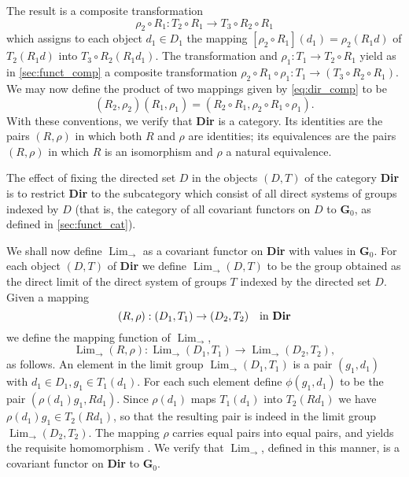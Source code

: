\documentclass[11pt,a4paper]{report}
\DeclareMathOperator{\Lim}{Lim}
\begin{document}
The result is a composite transformation
\begin{equation}\label{eq:dir_comp2}
	\rho_2\circ R_1:T_2\circ R_1\rightarrow T_3\circ R_2\circ R_1
\end{equation}
which assigns to each object $d_1\in D_1$ the mapping $[\rho_2\circ R_1](d_1)=\rho_2(R_1 d)$ of $T_2(R_1 d)$ into $T_3\circ R_2(R_1 d_1)$.
The transformation  and $\rho_1:T_1\rightarrow T_2\circ R_1$ yield as in \cref{sec:funct_comp}
a composite transformation $\rho_2\circ R_1\circ\rho_1: T_1\rightarrow (T_3\circ R_2\circ R_1)$.
We may now define the product of two mappings given by \cref{eq:dir_comp} to be
\begin{equation*}
	(R_2,\rho_2)(R_1,\rho_1)= (R_2\circ R_1,\rho_2\circ R_1\circ\rho_1).
\end{equation*}
With these conventions, we verify that \textbf{Dir} is a category. Its identities are the pairs $(R,\rho)$ in which both $R$ and $\rho$ are
identities; its equivalences are the pairs $(R,\rho)$ in which $R$ is an isomorphism and $\rho$ a natural equivalence.

The effect of fixing the directed set $D$ in the objects $(D,T)$ of the category \textbf{Dir} is to restrict \textbf{Dir} to the subcategory
which consist of all direct systems of groups indexed by $D$ (that is, the category of all covariant functors on $D$ to $\mathbf{G}_0$, as
defined in \cref{sec:funct_cat}).

We shall now define $\Lim_{\rightarrow}$ as a covariant functor on \textbf{Dir} with values in $\mathbf{G}_0$. For each object
$(D,T)$ of \textbf{Dir} we define $\Lim_{\rightarrow}(D,T)$ to be the group obtained as the direct limit of the direct system
of groups $T$ indexed by the directed set $D$. Given a mapping
\begin{equation}\label{eq:dir_map}
	(R,\rho):(D_1,T_1)\rightarrow (D_2,T_2)\quad\text{in \textbf{Dir}}
\end{equation}
we define the mapping function of $\Lim_{\rightarrow}$,
\begin{equation}\label{eq:dir_map2}
	\Lim_{\rightarrow}(R,\rho):\Lim_{\rightarrow}(D_1,T_1)\rightarrow\Lim_{\rightarrow}(D_2,T_2),
\end{equation}
as follows. An element in the limit group $\Lim_{\rightarrow}(D_1,T_1)$ is a pair $(g_1,d_1)$ with $d_1\in D_1, g_1\in T_1(d_1)$.
For each such element define $\phi(g_1,d_1)$ to be the pair $(\rho(d_1)g_1,R d_1)$. Since $\rho(d_1)$ maps $T_1(d_1)$ into
$T_2(R d_1)$ we have $\rho(d_1)g_1\in T_2(R d_1)$, so that the resulting pair is indeed in the limit group $\Lim_{\rightarrow}(D_2,T_2)$.
The mapping $\rho$ carries equal pairs into equal pairs, and yields the requisite homomorphism .
We verify that $\Lim_{\rightarrow}$, defined in this manner, is a covariant functor on \textbf{Dir} to $\mathbf{G}_0$.
\end{document}
